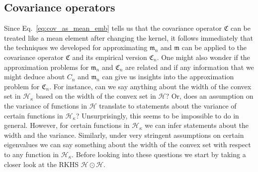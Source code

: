 \documentclass[AHL,Unicode,longabstracts,published]{cedram}
\theoremstyle{remark}
\newcommand{\cH}{\mathcal{H}}
\newcommand{\fkC}{\mathfrak{C}}
\newcommand{\mean}{\mathfrak{m}}
\begin{document}
\subsection{Covariance operators} \label{sec:cov_op_approx}
Since Eq.~\eqref{eq:cov_as_mean_emb} tells us that the covariance operator $\fkC$ can be treated like a mean element after changing the kernel, it follows immediately that the techniques we developed for approximating $\mean_n$ and $\mean$ can be applied to the covariance operator $\fkC$ and its empirical version $\fkC_n$. One might also wonder if the approximation problems for $\mean_n$ and $\fkC_n$ are related and if any information that we might deduce about $C_n$ and $\mean_n$ can give us insights into the approximation problem for $\fkC_n$. For instance, can we say anything about the width of the convex set in $\cH_\kappa$ based on the width of the convex set in $\cH$? Or, does an assumption on the variance of functions in $\cH$ translate to statements about the variance of certain functions in $\cH_\kappa$? Unsurprisingly, this seems to be impossible to do in general. However, for certain functions in $\cH_\kappa$ we can infer statements about the width and the variance. Similarly, under very stringent assumptions on certain eigenvalues we can say something about the width of the convex set with respect to any function in $\cH_\kappa$. Before looking into these questions we start by taking a closer look at the RKHS $\cH \odot \cH$.
\end{document}
